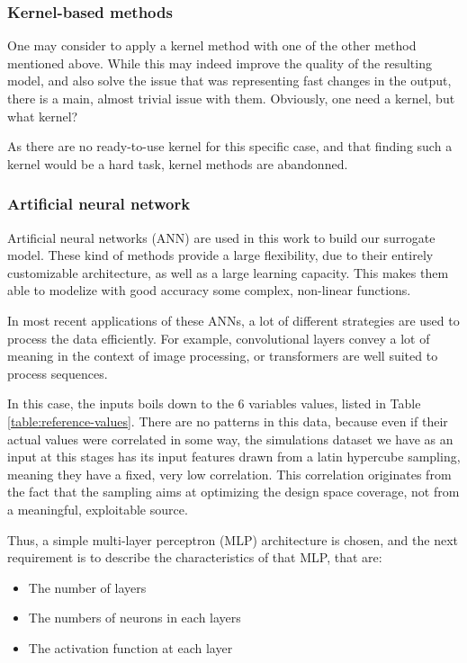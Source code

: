 \subsubsection{Kernel-based methods\label{section:kernel-methods}}

One may consider to apply a kernel method with one of the other method mentioned above. While this may indeed improve the quality of the resulting model, and also solve the issue that was representing fast changes in the output, there is a main, almost trivial issue with them. Obviously, one need a kernel, but what kernel?

As there are no ready-to-use kernel for this specific case, and that finding such a kernel would be a hard task, kernel methods are abandonned.

\subsubsection{Artificial neural network}

Artificial neural networks (ANN) are used in this work to build our surrogate model. These kind of methods provide a large flexibility, due to their entirely customizable architecture, as well as a large learning capacity. This makes them able to modelize with good accuracy some complex, non-linear functions.

In most recent applications of these ANNs, a lot of different strategies are used to process the data efficiently. For example, convolutional layers convey a lot of meaning in the context of image processing, or transformers are well suited to process sequences\cite{deep-learning-class}.

In this case, the inputs boils down to the 6 variables values, listed in Table \ref{table:reference-values}. There are no patterns in this data, because even if their actual values were correlated in some way, the simulations dataset we have as an input at this stages has its input features drawn from a latin hypercube sampling, meaning they have a fixed, very low correlation. This correlation originates from the fact that the sampling aims at optimizing the design space coverage, not from a meaningful, exploitable source.

Thus, a simple multi-layer perceptron (MLP) architecture is chosen, and the next requirement is to describe the characteristics of that MLP, that are:
\begin{itemize}
    \item The number of layers
    \item The numbers of neurons in each layers
    \item The activation function at each layer
\end{itemize}

